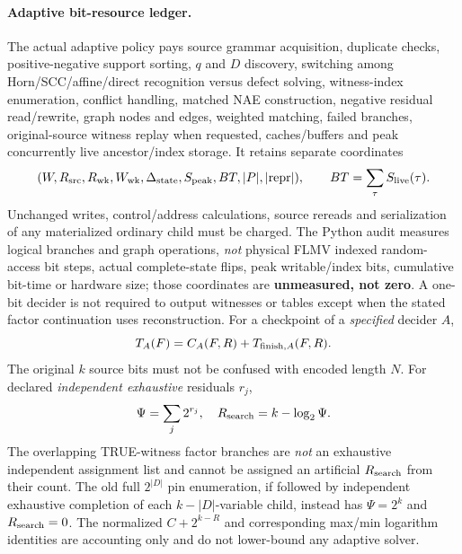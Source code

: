 \documentclass[11pt]{article}
\begin{document}
\paragraph{Adaptive bit-resource ledger.}
The actual adaptive policy pays source grammar acquisition, duplicate checks, positive-negative support sorting, $q$ and $D$ discovery, switching among Horn/SCC/affine/direct recognition versus defect solving, witness-index enumeration, conflict handling, matched NAE construction, negative residual read/rewrite, graph nodes and edges, weighted matching, failed branches, original-source witness replay when requested, caches/buffers and peak concurrently live ancestor/index storage. It retains separate coordinates
\[
(W,R_{\rm src},R_{\rm wk},W_{\rm wk},\Delta_{\rm state},
S_{\rm peak},BT,|P|,|\mathrm{repr}|),\qquad BT=\sum_\tau S_{\rm live}(\tau).
\]
Unchanged writes, control/address calculations, source rereads and serialization of any materialized ordinary child must be charged. The Python audit measures logical branches and graph operations, \emph{not} physical FLMV indexed random-access bit steps, actual complete-state flips, peak writable/index bits, cumulative bit-time or hardware size; those coordinates are \textbf{unmeasured, not zero}. A one-bit decider is not required to output witnesses or tables except when the stated factor continuation uses reconstruction. For a checkpoint of a \emph{specified} decider $A$,
\[
T_A(F)=C_A(F,R)+T_{{\rm finish},A}(F,R).
\]
The original $k$ source bits must not be confused with encoded length $N$. For declared \emph{independent exhaustive} residuals $r_j$,
\[
\Psi=\sum_j2^{r_j},\quad R_{\rm search}=k-\log_2\Psi.
\]
The overlapping TRUE-witness factor branches are \emph{not} an exhaustive independent assignment list and cannot be assigned an artificial $R_{\rm search}$ from their count. The old full $2^{|D|}$ pin enumeration, if followed by independent exhaustive completion of each $k-|D|$-variable child, instead has $\Psi=2^k$ and $R_{\rm search}=0$. The normalized $C+2^{k-R}$ and corresponding max/min logarithm identities are accounting only and do not lower-bound any adaptive solver.
\end{document}
